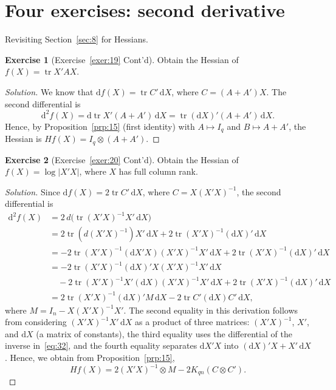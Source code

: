 \documentclass[14pt]{extarticle}
\theoremstyle{plain}
\theoremstyle{definition}
\newtheorem{exercise}{Exercise}
\theoremstyle{remark}
\newenvironment{solution}{%
  \begin{proof}[Solution]%
}{%
  \end{proof}%
}
\DeclareMathOperator{\tr}{tr}
\newcommand{\dd}{\mathrm{d}}
\begin{document}
\section{Four exercises: second derivative}\label{sec:12}

Revisiting Section~\ref{sec:8} for Hessians.

\begin{exercise}[Exercise~\ref{exer:19} Cont'd]\label{exer:29}
Obtain the Hessian of $f(X) = \tr X'AX$.
\end{exercise}

\begin{solution}
We know that $\dd f(X) = \tr C'\, \dd X$, where $C = (A + A')X$. The second differential is
\[
\dd^2 f(X) = \dd\tr X'(A + A')\, \dd X = \tr(\dd X)'(A + A')\, \dd X.
\]
Hence, by Proposition~\ref{prp:15} (first identity) with $A \mapsto I_q$ and $B \mapsto A+A'$, the Hessian is $Hf(X) = I_q \otimes (A + A')$.
\end{solution}

\begin{exercise}[Exercise~\ref{exer:20} Cont'd]\label{exer:30}
Obtain the Hessian of $f(X) = \log|X'X|$, where $X$ has full column rank.
\end{exercise}

\begin{solution}
Since $\dd f(X) = 2\tr C'\, \dd X$, where $C = X(X'X)^{-1}$, the second differential is
\begin{align*}
\dd^2 f(X) &= 2\, d\bigl(\tr(X'X)^{-1}X'\, \dd X\bigr) \\
&= 2\tr(d(X'X)^{-1})X'\, \dd X + 2\tr(X'X)^{-1}(\dd X)'\, \dd X \\
&= -2\tr(X'X)^{-1}(\dd X'X)(X'X)^{-1}X'\, \dd X + 2\tr(X'X)^{-1}(\dd X)'\, \dd X \\
&= -2\tr(X'X)^{-1}(\dd X)'X(X'X)^{-1}X'\, \dd X \\
&\quad - 2\tr(X'X)^{-1}X'(\dd X)(X'X)^{-1}X'\, \dd X + 2\tr(X'X)^{-1}(\dd X)'\, \dd X \\
&= 2\tr(X'X)^{-1}(\dd X)'M\, \dd X - 2\tr C'(\dd X)C'\, \dd X,
\end{align*}
where $M = I_n - X(X'X)^{-1}X'$. The second equality in this derivation follows from considering $(X'X)^{-1}X'\, \dd X$ as a product of three matrices: $(X'X)^{-1}$, $X'$, and $\dd X$ (a matrix of constants), the third equality uses the differential of the inverse in~\eqref{eq:32}, and the fourth equality separates $\dd X'X$ into $(\dd X)'X + X'\, \dd X$. Hence, we obtain from Proposition~\ref{prp:15},
\[
Hf(X) = 2(X'X)^{-1} \otimes M - 2K_{qn}(C \otimes C').
\]
\end{solution}
\end{document}
